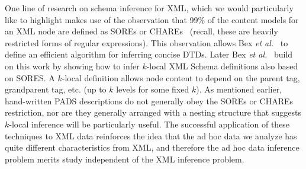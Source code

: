 One line of research on schema inference for XML, which we would
particularly like to highlight makes use of the 
observation that 99\% of the content models for an XML node are defined as
SOREs or CHAREs~\cite{martens+:expressiveness-xml-schema} (recall, these
are heavily restricted forms of regular expressions).  
This observation allows Bex {\em et al.}~\cite{bex+:dtd-inference} to define
an efficient algorithm for inferring concise DTDs.  Later 
Bex {\em et al.}~\cite{bex+:inferring-xml-schema} build on this work 
by showing how to infer $k$-local XML Schema definitions also based on
SORES.  A $k$-local definition allows node content to depend on the parent
tag, grandparent tag, etc. (up to $k$ levels for some fixed $k$).
As mentioned earlier, hand-written PADS descriptions do not generally obey
the SOREs or CHAREs restriction, nor are they generally arranged with a nesting
structure that suggests $k$-local inference will be particularly useful.
The successful application of these techniques to XML data reinforces 
the idea that the ad hoc data we analyze has quite different characteristics
from XML, and therefore the ad hoc data inference problem merits study
independent of the XML inference problem.

